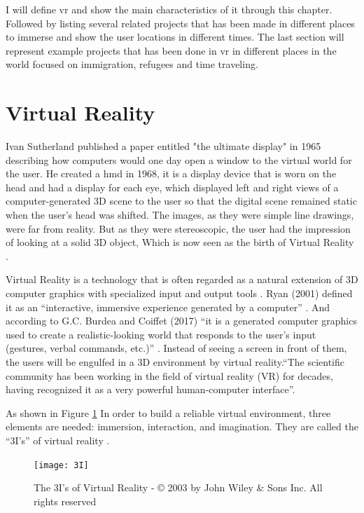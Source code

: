 \label{StateoftheArt}
I will define \acrfull{vr} and show the main characteristics of it through this chapter. Followed by listing several related projects that has been made in different places to immerse and show the user locations in different times. The last section will represent example projects that has been done in \acrshort{vr} in different places in the world focused on immigration, refugees and time traveling.   

\section{Virtual Reality}
Ivan Sutherland published a paper entitled "the ultimate display" in 1965 describing how computers would one day open a window to the virtual world for the user. He created a \acrfull{hmd} in 1968, it is a display device that is worn on the head and had a display for each eye, which displayed left and right views of a computer-generated 3D scene to the user so that the digital scene remained static when the user's head was shifted. The images, as they were simple line drawings, were far from reality. But as they were stereoscopic, the user had the impression of looking at a solid 3D object, Which is now seen as the birth of Virtual Reality \citep{Vince2011}.  

Virtual Reality is a technology that is often regarded as a natural extension of 3D computer graphics with specialized input and output tools \citep{Jayaram1997}. Ryan (2001) defined it as an “interactive, immersive experience generated by a computer” \citep{Ryan2001}. And according to G.C. Burdea and Coiffet (2017) “it is a generated computer graphics used to create a realistic-looking world that responds to the user’s input (gestures, verbal commands, etc.)” \cite[p.20]{burdea2017virtual}. Instead of seeing a screen in front of them, the users will be engulfed in a 3D environment by virtual reality.“The scientific community has been working in the field of virtual reality (VR) for decades, having recognized it as a very powerful human-computer interface”\cite[p.19]{burdea2017virtual}. 

As shown in Figure \ref{fig:3I} In order to build a reliable virtual environment, three elements are needed:  immersion, interaction, and imagination. They are called the “3I’s” of virtual reality \citep{Hu2016,burdea2017virtual,Bamodu2013VirtualComponents}.

\begin{figure} %
    \centering
    \texttt{[image: 3I]}
    \caption{The 3I's of Virtual Reality - © 2003 by John Wiley \& Sons Inc. All rights
reserved}
    \label{fig:3I}
\end{figure}



